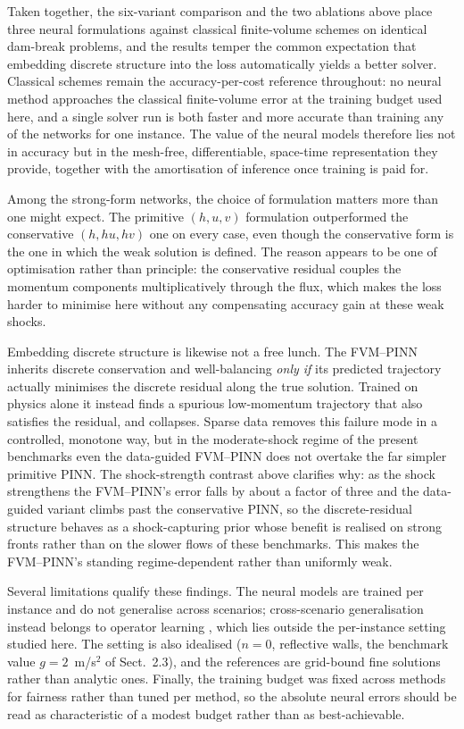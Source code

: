 \documentclass[12pt]{article}
\newenvironment{newtext}{\par\color{red}}{\par}
\begin{document}
\begin{newtext}
Taken together, the six-variant comparison and the two ablations above place three neural formulations against classical finite-volume schemes on identical dam-break problems, and the results temper the common expectation that embedding discrete structure into the loss automatically yields a better solver. Classical schemes remain the accuracy-per-cost reference throughout: no neural method approaches the classical finite-volume error at the training budget used here, and a single solver run is both faster and more accurate than training any of the networks for one instance. The value of the neural models therefore lies not in accuracy but in the mesh-free, differentiable, space-time representation they provide, together with the amortisation of inference once training is paid for.

Among the strong-form networks, the choice of formulation matters more than one might expect. The primitive $(h,u,v)$ formulation outperformed the conservative $(h,hu,hv)$ one on every case, even though the conservative form is the one in which the weak solution is defined. The reason appears to be one of optimisation rather than principle: the conservative residual couples the momentum components multiplicatively through the flux, which makes the loss harder to minimise here without any compensating accuracy gain at these weak shocks.

Embedding discrete structure is likewise not a free lunch. The FVM--PINN inherits discrete conservation and well-balancing \emph{only if} its predicted trajectory actually minimises the discrete residual along the true solution. Trained on physics alone it instead finds a spurious low-momentum trajectory that also satisfies the residual, and collapses. Sparse data removes this failure mode in a controlled, monotone way, but in the moderate-shock regime of the present benchmarks even the data-guided FVM--PINN does not overtake the far simpler primitive PINN. The shock-strength contrast above clarifies why: as the shock strengthens the FVM--PINN's error falls by about a factor of three and the data-guided variant climbs past the conservative PINN, so the discrete-residual structure behaves as a shock-capturing prior whose benefit is realised on strong fronts rather than on the slower flows of these benchmarks. This makes the FVM--PINN's standing regime-dependent rather than uniformly weak.

Several limitations qualify these findings. The neural models are trained per instance and do not generalise across scenarios; cross-scenario generalisation instead belongs to operator learning \cite{lu2021deeponet,li2021fourier,li2024pino}, which lies outside the per-instance setting studied here. The setting is also idealised ($n=0$, reflective walls, the benchmark value $g=2$~m/s$^2$ of Sect.~2.3), and the references are grid-bound fine solutions rather than analytic ones. Finally, the training budget was fixed across methods for fairness rather than tuned per method, so the absolute neural errors should be read as characteristic of a modest budget rather than as best-achievable.
\end{newtext}
\end{document}
